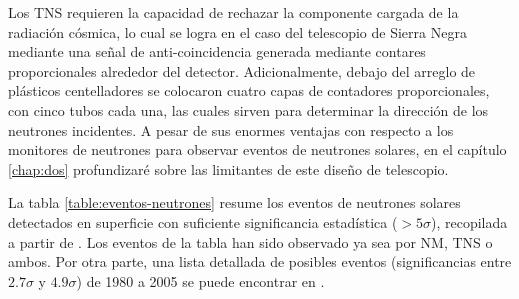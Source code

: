 Los TNS requieren la capacidad de rechazar la componente cargada de la radiación cósmica, lo cual se logra en el caso del telescopio de Sierra Negra mediante una señal de anti-coincidencia generada mediante contares proporcionales alrededor del detector. Adicionalmente, debajo del arreglo de plásticos centelladores se colocaron cuatro capas de contadores proporcionales, con cinco tubos cada una, las cuales sirven para determinar la dirección de los neutrones incidentes. A pesar de sus enormes ventajas con respecto a los monitores de neutrones para observar eventos de neutrones solares, en el capítulo \ref{chap:dos} profundizaré sobre las limitantes de este diseño de telescopio.

La tabla \ref{table:eventos-neutrones} resume los eventos de neutrones solares detectados en superficie con suficiente significancia estadística ($>5\sigma$), recopilada a partir de \cite{watanabe05,sako06,muraki16}. Los eventos de la tabla han sido observado ya sea por NM, TNS o ambos. Por otra parte, una lista detallada de posibles eventos (significancias entre $2.7\sigma$ y $4.9\sigma$) de \num{1980} a \num{2005} se puede encontrar en \cite{mirosh15}.

